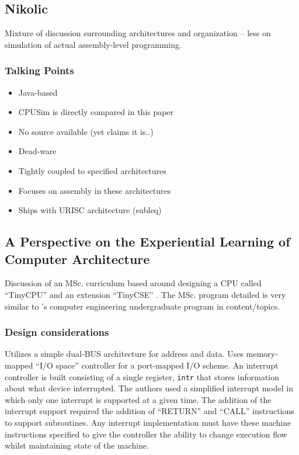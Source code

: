 \subsection{Nikolic}

\cite{Nikolic2009}

Mixture of discussion surrounding architectures and organization -- less on simulation of actual assembly-level programming.  


\subsubsection{Talking Points}

\begin{itemize}
    \item Java-based
    \item CPUSim is directly compared in this paper
    \item No source available (yet claims it is..)
    \item Dead-ware
    \item Tightly coupled to specified architectures
    \item Focuses on assembly in these architectures
    \item Ships with URISC architecture (subleq)
\end{itemize}

\subsection{A Perspective on the Experiential Learning of Computer Architecture}

\cite{McLoughlin2010, Nakamura2013}

Discussion of an MSc. curriculum based around designing a CPU called ``TinyCPU'' \cite{McLoughlin2010} and an extension ``TinyCSE'' \cite{Nakamura2013}. The MSc. program detailed is very similar to \uwo's computer engineering undergraduate program in content/topics. 

\subsubsection{Design considerations}

Utilizes a simple dual-BUS architecture for address and data. Uses memory-mapped ``I/O space'' controller for a port-mapped I/O scheme. An interrupt controller is built consisting of a single register, \verb|intr| that stores information about what device interrupted. The authors used a simplified interrupt model in which only one interrupt is supported at a given time. The addition of the interrupt support required the addition of ``RETURN'' and ``CALL'' instructions to support subroutines. Any interrupt implementation must have these machine instructions specified to give the controller the ability to change execution flow whilst maintaining state of the machine. 


